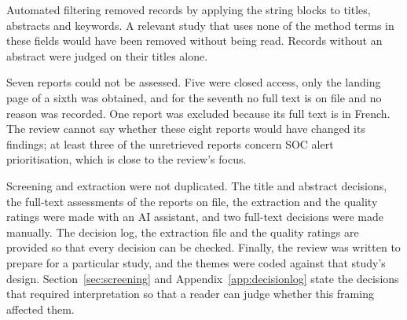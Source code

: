 Automated filtering removed \NAuto{} records by applying the string blocks to titles, abstracts and keywords. A relevant study that uses none of the method terms in these fields would have been removed without being read. Records without an abstract were judged on their titles alone.

Seven reports could not be assessed. Five were closed access, only the landing page of a sixth was obtained, and for the seventh no full text is on file and no reason was recorded. One report was excluded because its full text is in French. The review cannot say whether these eight reports would have changed its findings; at least three of the unretrieved reports concern SOC alert prioritisation, which is close to the review's focus.

Screening and extraction were not duplicated. The title and abstract decisions, the full-text assessments of the reports on file, the extraction and the quality ratings were made with an AI assistant, and two full-text decisions were made manually. The decision log, the extraction file and the quality ratings are provided so that every decision can be checked. Finally, the review was written to prepare for a particular study, and the themes were coded against that study's design. Section~\ref{sec:screening} and Appendix~\ref{app:decisionlog} state the decisions that required interpretation so that a reader can judge whether this framing affected them.
